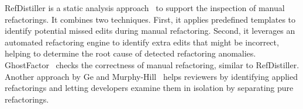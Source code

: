 RefDistiller is a static analysis approach~\cite{Alves2017:refdistiller,Alves:2014:RRA:2635868.2661674} to support the inspection of manual refactorings. It combines two techniques. First, it applies predefined templates to identify potential missed edits during manual refactoring. Second, it leverages an automated refactoring engine to identify extra edits that might be incorrect, helping to  determine the root cause of detected refactoring anomalies. GhostFactor~\cite{geManual2014} checks the correctness of manual refactoring, similar to RefDistiller. Another approach by Ge and Murphy-Hill~\cite{emersoncodereview:2014chase} helps reviewers by identifying applied refactorings and letting developers examine them in isolation by separating pure refactorings. 



